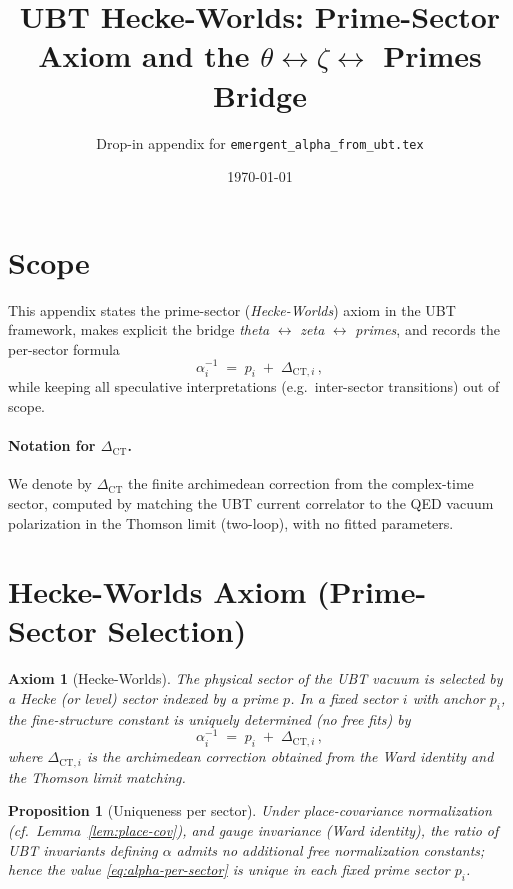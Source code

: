 \documentclass[11pt,a4paper]{article}
\title{UBT Hecke-Worlds: Prime-Sector Axiom and the \texorpdfstring{$\theta \leftrightarrow \zeta \leftrightarrow$}{theta <-> zeta <->} Primes Bridge}
\author{Drop-in appendix for \texttt{emergent\_alpha\_from\_ubt.tex}}
\date{\today}
\newtheorem{axiom}{Axiom}
\newtheorem{proposition}{Proposition}
\begin{document}
\maketitle

\section*{Scope}
This appendix states the prime-sector (\emph{Hecke-Worlds}) axiom in the UBT framework, makes explicit the bridge
\emph{theta} $\leftrightarrow$ \emph{zeta} $\leftrightarrow$ \emph{primes}, and records the per-sector formula
\begin{equation}
\alpha_i^{-1} \;=\; p_i \;+\; \Delta_{\mathrm{CT},i}\,,
\end{equation}
while keeping all speculative interpretations (e.g.\ inter-sector transitions) out of scope.

\paragraph{Notation for $\Delta_{\mathrm{CT}}$.}
We denote by $\Delta_{\mathrm{CT}}$ the finite archimedean correction from the complex-time sector,
computed by matching the UBT current correlator to the QED vacuum polarization in the Thomson limit (two-loop), with no fitted parameters.

\section{Hecke-Worlds Axiom (Prime-Sector Selection)}
\begin{axiom}[Hecke-Worlds]\label{ax:hecke-worlds}
The physical sector of the UBT vacuum is selected by a Hecke (or level) sector indexed by a prime $p$.
In a fixed sector $i$ with anchor $p_i$, the fine-structure constant is uniquely determined (no free fits) by
\begin{equation}\label{eq:alpha-per-sector}
\alpha_i^{-1} \;=\; p_i \;+\; \Delta_{\mathrm{CT},i}\,,
\end{equation}
where $\Delta_{\mathrm{CT},i}$ is the archimedean correction obtained from the Ward identity and the Thomson limit matching.
\end{axiom}

\begin{proposition}[Uniqueness per sector]\label{prop:uniqueness}
Under place-covariance normalization (cf.\ Lemma~\ref{lem:place-cov}), and gauge invariance (Ward identity),
the ratio of UBT invariants defining $\alpha$ admits no additional free normalization constants; hence the value \eqref{eq:alpha-per-sector}
is \emph{unique} in each fixed prime sector $p_i$.
\end{proposition}
\end{document}
